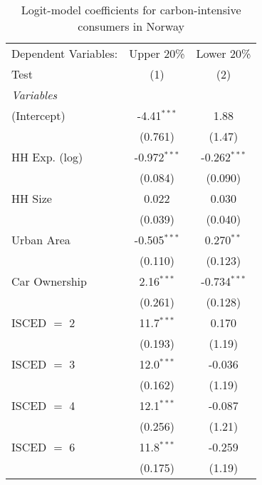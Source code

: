 
\begin{table}[htbp!]
   \centering
   \small
   \begin{adjustbox}{width = 1\textwidth, max height = 0.95\textheight, center}
      \begin{threeparttable}[b]
         \caption{\label{tab:Logit_1_NOR} Logit-model coefficients for carbon-intensive consumers in Norway}
         \begin{tabular}{lcc}
            \tabularnewline \midrule \midrule
            Dependent Variables: & Upper 20\%     & Lower 20\%\\   
            Test                 & (1)            & (2)\\  
            \midrule
            \emph{Variables}\\
            (Intercept)          & -4.41$^{***}$  & 1.88\\   
                                 & (0.761)        & (1.47)\\   
            HH Exp. (log)        & -0.972$^{***}$ & -0.262$^{***}$\\   
                                 & (0.084)        & (0.090)\\   
            HH Size              & 0.022          & 0.030\\   
                                 & (0.039)        & (0.040)\\   
            Urban Area           & -0.505$^{***}$ & 0.270$^{**}$\\   
                                 & (0.110)        & (0.123)\\   
            Car Ownership        & 2.16$^{***}$   & -0.734$^{***}$\\   
                                 & (0.261)        & (0.128)\\   
            ISCED $=$ 2          & 11.7$^{***}$   & 0.170\\   
                                 & (0.193)        & (1.19)\\   
            ISCED $=$ 3          & 12.0$^{***}$   & -0.036\\   
                                 & (0.162)        & (1.19)\\   
            ISCED $=$ 4          & 12.1$^{***}$   & -0.087\\   
                                 & (0.256)        & (1.21)\\   
            ISCED $=$ 6          & 11.8$^{***}$   & -0.259\\   
                                 & (0.175)        & (1.19)\\   

\end{tabular}
\end{threeparttable}
\end{adjustbox}
\end{table}
